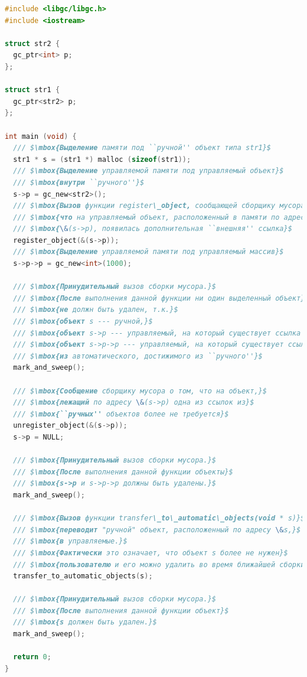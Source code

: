 %
\begin{lstlisting}[language=cpp, mathescape=true, caption=Совмещение ручного и автоматического управления памятью]
#include <libgc/libgc.h>
#include <iostream>

struct str2 {
  gc_ptr<int> p;
};

struct str1 {
  gc_ptr<str2> p;
};

int main (void) {
  /// $\mbox{Выделение памяти под ``ручной'' объект типа str1}$
  str1 * s = (str1 *) malloc (sizeof(str1));
  /// $\mbox{Выделение управляемой памяти под управляемый объект}$
  /// $\mbox{внутри ``ручного''}$
  s->p = gc_new<str2>();
  /// $\mbox{Вызов функции register\_object, сообщающей сборщику мусора,}$
  /// $\mbox{что на управляемый объект, расположенный в памяти по адресу}$
  /// $\mbox{\&(s->p), появилась дополнительная ``внешняя'' ссылка}$
  register_object(&(s->p));
  /// $\mbox{Выделение управляемой памяти под управляемый массив}$
  s->p->p = gc_new<int>(1000);
  
  /// $\mbox{Принудительный вызов сборки мусора.}$
  /// $\mbox{После выполнения данной функции ни один выделенный объект}$
  /// $\mbox{не должн быть удален, т.к.}$
  /// $\mbox{объект s --- ручной,}$
  /// $\mbox{объект s->p --- управляемый, на который существует ссылка из ручного,}$
  /// $\mbox{объект s->p->p --- управляемый, на который существует ссылка}$
  /// $\mbox{из автоматического, достижимого из ``ручного''}$
  mark_and_sweep();
  
  /// $\mbox{Сообщение сборщику мусора о том, что на объект,}$
  /// $\mbox{лежащий по адресу \&(s->p) одна из ссылок из}$
  /// $\mbox{``ручных'' объектов более не требуется}$
  unregister_object(&(s->p));
  s->p = NULL;
  
  /// $\mbox{Принудительный вызов сборки мусора.}$
  /// $\mbox{После выполнения данной функции объекты}$
  /// $\mbox{s->p и s->p->p должны быть удалены.}$
  mark_and_sweep();
  
  /// $\mbox{Вызов функции transfer\_to\_automatic\_objects(void * s)}$
  /// $\mbox{переводит "ручной" объект, расположенный по адресу \&s,}$
  /// $\mbox{в управляемые.}$
  /// $\mbox{Фактически это означает, что объект s более не нужен}$
  /// $\mbox{пользователю и его можно удалить во время ближайшей сборки мусора}$
  transfer_to_automatic_objects(s);
  
  /// $\mbox{Принудительный вызов сборки мусора.}$
  /// $\mbox{После выполнения данной функции объект}$
  /// $\mbox{s должен быть удален.}$
  mark_and_sweep();

  return 0;
}
\end{lstlisting}

